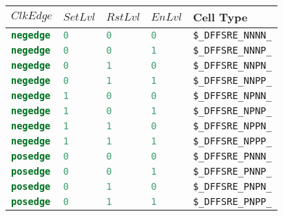 \begin{table}[t]
\hfil
\begin{tabular}[t]{lllll}
$ClkEdge$ & $SetLvl$ & $RstLvl$ & $EnLvl$ & Cell Type \\
\hline
\lstinline[language=Verilog];negedge; & \lstinline[language=Verilog];0; & \lstinline[language=Verilog];0; & \lstinline[language=Verilog];0; & {\tt \$\_DFFSRE\_NNNN\_} \\
\lstinline[language=Verilog];negedge; & \lstinline[language=Verilog];0; & \lstinline[language=Verilog];0; & \lstinline[language=Verilog];1; & {\tt \$\_DFFSRE\_NNNP\_} \\
\lstinline[language=Verilog];negedge; & \lstinline[language=Verilog];0; & \lstinline[language=Verilog];1; & \lstinline[language=Verilog];0; & {\tt \$\_DFFSRE\_NNPN\_} \\
\lstinline[language=Verilog];negedge; & \lstinline[language=Verilog];0; & \lstinline[language=Verilog];1; & \lstinline[language=Verilog];1; & {\tt \$\_DFFSRE\_NNPP\_} \\
\lstinline[language=Verilog];negedge; & \lstinline[language=Verilog];1; & \lstinline[language=Verilog];0; & \lstinline[language=Verilog];0; & {\tt \$\_DFFSRE\_NPNN\_} \\
\lstinline[language=Verilog];negedge; & \lstinline[language=Verilog];1; & \lstinline[language=Verilog];0; & \lstinline[language=Verilog];1; & {\tt \$\_DFFSRE\_NPNP\_} \\
\lstinline[language=Verilog];negedge; & \lstinline[language=Verilog];1; & \lstinline[language=Verilog];1; & \lstinline[language=Verilog];0; & {\tt \$\_DFFSRE\_NPPN\_} \\
\lstinline[language=Verilog];negedge; & \lstinline[language=Verilog];1; & \lstinline[language=Verilog];1; & \lstinline[language=Verilog];1; & {\tt \$\_DFFSRE\_NPPP\_} \\
\lstinline[language=Verilog];posedge; & \lstinline[language=Verilog];0; & \lstinline[language=Verilog];0; & \lstinline[language=Verilog];0; & {\tt \$\_DFFSRE\_PNNN\_} \\
\lstinline[language=Verilog];posedge; & \lstinline[language=Verilog];0; & \lstinline[language=Verilog];0; & \lstinline[language=Verilog];1; & {\tt \$\_DFFSRE\_PNNP\_} \\
\lstinline[language=Verilog];posedge; & \lstinline[language=Verilog];0; & \lstinline[language=Verilog];1; & \lstinline[language=Verilog];0; & {\tt \$\_DFFSRE\_PNPN\_} \\
\lstinline[language=Verilog];posedge; & \lstinline[language=Verilog];0; & \lstinline[language=Verilog];1; & \lstinline[language=Verilog];1; & {\tt \$\_DFFSRE\_PNPP\_} \\

\end{tabular}
\end{table}

